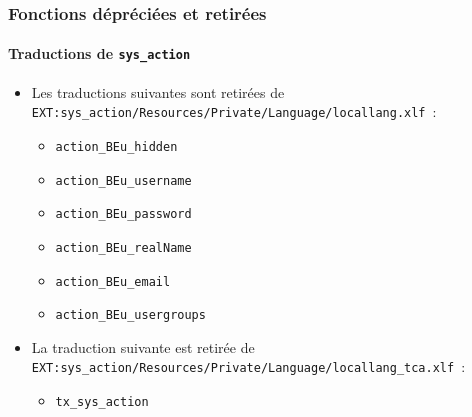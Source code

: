 \begin{frame}[fragile]
	\frametitle{Fonctions dépréciées et retirées}
	\framesubtitle{Traductions de \texttt{sys\_action}}

	\begin{itemize}
		\item Les traductions suivantes sont retirées de
			\smaller\texttt{EXT:sys\_action/Resources/Private/Language/locallang.xlf}~:\normalsize

		\begin{itemize}
			\item \texttt{action\_BEu\_hidden}
			\item \texttt{action\_BEu\_username}
			\item \texttt{action\_BEu\_password}
			\item \texttt{action\_BEu\_realName}
			\item \texttt{action\_BEu\_email}
			\item \texttt{action\_BEu\_usergroups}
		\end{itemize}

		\item La traduction suivante est retirée de
			\smaller\texttt{EXT:sys\_action/Resources/Private/Language/locallang\_tca.xlf}~:\normalsize

		\begin{itemize}
			\item \texttt{tx\_sys\_action}
		\end{itemize}

	\end{itemize}

\end{frame}



